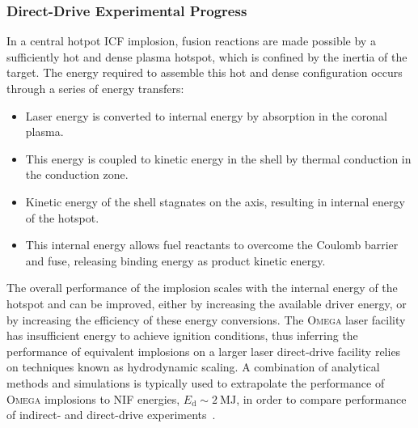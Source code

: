 \subsubsection{Direct-Drive Experimental Progress}%
\label{sec:intro_direct_exp}

In a central hotpot \ac{ICF} implosion, fusion reactions are made possible by a sufficiently hot and dense plasma hotspot, which is confined by the inertia of the target.
The energy required to assemble this hot and dense configuration occurs through a series of energy transfers:
\begin{itemize}
    \item Laser energy is converted to internal energy by absorption in the coronal plasma.
    \item This energy is coupled to kinetic energy in the shell by thermal conduction in the conduction zone.
    \item Kinetic energy of the shell stagnates on the axis, resulting in internal energy of the hotspot.
    \item This internal energy allows fuel reactants to overcome the Coulomb barrier and fuse, releasing binding energy as product kinetic energy.
\end{itemize}
The overall performance of the implosion scales with the internal energy of the hotspot and can be improved, either by increasing the available driver energy, or by increasing the efficiency of these energy conversions.
The \textsc{Omega} laser facility has insufficient energy to achieve ignition conditions, thus inferring the performance of equivalent implosions on a larger laser direct-drive facility relies on techniques known as hydrodynamic scaling.
A combination of analytical methods and simulations is typically used to extrapolate the performance of \textsc{Omega} implosions to \ac{NIF} energies, $E_{\text{d}}\sim2\ \text{MJ}$, in order to compare performance of indirect- and direct-drive experiments~\cite{zhou_hydrodynamic_2007}.

